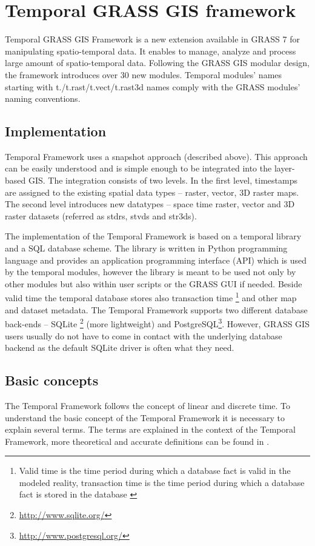 \documentclass[a4paper,12pt]{article}
\title{}
\author{Anna Kratochvílová}
\newcommand{\tf}{Temporal Framework\xspace}
\begin{document}
\section{Temporal GRASS GIS framework}
Temporal GRASS GIS Framework is a new extension available in GRASS 7 for manipulating spatio-temporal data.
It enables to manage, analyze and process large amount of spatio-temporal data.
Following the GRASS GIS modular design, the framework introduces over 30 new modules.
Temporal modules' names starting with t./t.rast/t.vect/t.rast3d names
comply with the GRASS modules' naming conventions.

\subsection{Implementation}
\tf uses a snapshot approach (described above).
This approach can be easily understood and is simple enough to be integrated into the layer-based GIS.
The integration consists of two levels.
In the first level, timestamps are assigned to the existing spatial data types -- raster, vector, 3D raster maps.
The second level introduces new datatypes -- space time raster,
vector and 3D raster datasets (referred as stdrs, stvds and str3ds).

The implementation of the \tf is based on a temporal library and a SQL database scheme.
The library is written in Python programming language and provides an application programming interface (API) which is used by the temporal modules,
however the library is meant to be used not only by other modules but also within user scripts or the GRASS GUI if needed.
Beside valid time the temporal database stores also transaction time%
\footnote{Valid time is the time period during which a database fact is valid in the modeled reality,
transaction time  is the time period during which a database fact is stored in the database \cite{temporalGlossary}}
and other map and dataset metadata.
The \tf supports two different database back-ends -- SQLite%
\footnote{\url{http://www.sqlite.org/}} (more lightweight) and
PostgreSQL\footnote{\url{http://www.postgresql.org/}}.
However, GRASS GIS users usually do not have to come in contact with the underlying database backend
as the default SQLite driver is often what they need.

\subsection{Basic concepts}
The \tf follows the concept of linear and discrete time.
To understand the basic concept of the \tf it is necessary to explain several terms.
The terms are explained in the context of the \tf , more theoretical and accurate definitions can be found in \cite{temporalGlossary}.
\end{document}
